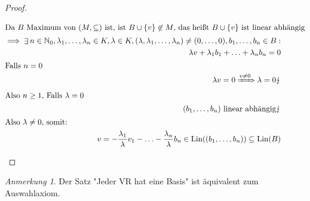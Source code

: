 \documentclass[a4paper]{scrartcl}
\DeclareMathOperator{\Exists}{\exists}
\DeclareMathOperator{\Lin}{Lin}
\theoremstyle{definition}
\theoremstyle{plain}
\theoremstyle{plain}
\theoremstyle{remark}
\theoremstyle{remark}
\newtheorem{note}{Anmerkung}
\theoremstyle{remark}
\theoremstyle{remark}
\theoremstyle{remark}
\begin{document}
\begin{proof}
\begin{enumerate}
\begin{align*}
\intertext{Da $B$ Maximum von $(M,\subseteq)$ ist, ist $B \cup \{v\} \not \in M$, das heißt $B\cup \{v\}$ ist linear abhängig}
\implies \Exists n\in\mathbb{N}_0, \lambda_1, \ldots, \lambda_n \in K, \lambda \in K, (\lambda, \lambda_1, \ldots, \lambda_n) \neq (0, \ldots, 0), b_1, \ldots, b_n \in B: \\
\lambda v + \lambda_1 b_1 + \ldots + \lambda_n b_n = 0 \\
\intertext{Falls $n = 0$}
\lambda v = 0 \xRightarrow{v \neq 0} \lambda = 0 \lightning \\
\intertext{Also $n \geq 1$, Falls $\lambda = 0$}
(b_1, \ldots, b_n) ~\text{linear abhängig} \lightning \\
\intertext{Also $\lambda \neq 0$, somit:}
v = -\frac{\lambda_1}{\lambda} v_1 - \ldots - \frac{\lambda_n}{\lambda} b_n \in\Lin((b_1, \ldots, b_n)) \subseteq \Lin(B)
\end{align*}
\end{enumerate}
\end{proof}
\begin{note}
Der Satz "Jeder VR hat eine Basis" ist äquivalent zum Auswahlaxiom.
\end{note}
\end{document}
